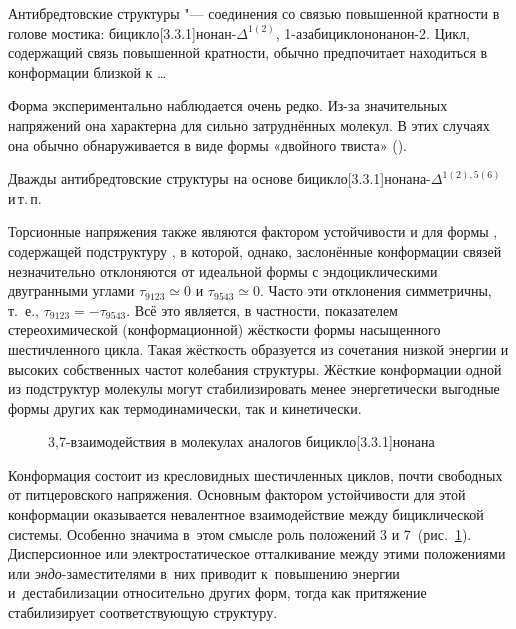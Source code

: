 Антибредтовские структуры "--- соединения со связью повышенной кратности в голове мостика: бицикло[3.3.1]нонан-$\Delta^{1(2)}$, 1-азабицикло\-[3.3.1]нонанон-2. Цикл, содержащий связь повышенной кратности, обычно предпочитает находиться в конформации близкой к \dots

\begin{center}
   \quad
   \quad 
\end{center}


Форма \BB{} экспериментально наблюдается очень редко. Из-за значительных напряжений она характерна для сильно затруднённых молекул. В этих случаях она обычно обнаруживается в виде формы «двойного твиста» (\TT{}).

Дважды антибредтовские структуры на основе бицикло[3.3.1]нонана-$\Delta^{1(2),5(6)}$  и\,т.\,п.

\begin{center}
   \quad
   \quad {}
\end{center}

Торсионные напряжения также являются фактором устойчивости и для формы \CB{}, содержащей подструктуру , в которой, однако, заслонённые конформации связей незначительно отклоняются от идеальной формы  с эндоциклическими двугранными углами $\tau_{9123}\simeq 0$ и $\tau_{9543}\simeq 0$. Часто эти отклонения симметричны, т. е., $\tau_{9123} = - \tau_{9543}$. Всё это является, в частности, показателем стереохимической (конформационной) жёсткости формы  насыщенного шестичленного цикла. Такая жёсткость образуется из сочетания низкой энергии и высоких собственных частот колебания структуры. Жёсткие конформации одной из подструктур молекулы могут стабилизировать менее энергетически выгодные формы других как термодинамически, так и кинетически.

\begin{figure}
\caption{3,7-взаимодействия в молекулах аналогов бицикло[3.3.1]нонана\label{fig:Interactions:37}}
\centerfloat{}
\end{figure}

Конформация \CC{} состоит из кресловидных шестичленных циклов, почти свободных от питцеровского напряжения. Основным фактором устойчивости для этой конформации оказывается невалентное взаимодействие между  бициклической системы. Особенно значима в~этом смысле роль положений 3 и 7~(рис.~\ref{fig:Interactions:37}). Дисперсионное или электростатическое отталкивание между этими положениями или \emph{эндо}-заместителями в~них приводит к~повышению энергии и~дестабилизации \CC{} относительно других форм, тогда как притяжение стабилизирует соответствующую структуру.

